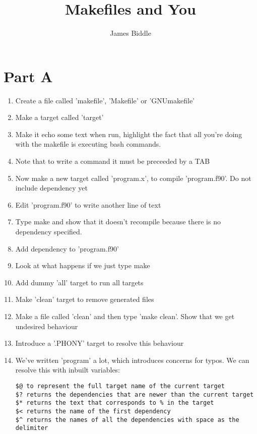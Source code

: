 \documentclass{article}
\begin{document}
\title{Makefiles and You}
\author{James Biddle}
\maketitle
\section{Part A}
\begin{enumerate}
\item Create a file called 'makefile', 'Makefile' or 'GNUmakefile'
\item Make a target called 'target'
\item Make it echo some text when run, highlight the fact that all you're doing with the makefile is executing bash commands.
\item Note that to write a command it must be preceeded by a TAB
\item Now make a new target called 'program.x', to compile 'program.f90'. Do not include dependency yet
\item Edit 'program.f90' to write another line of text
\item Type make and show that it doesn't recompile because there is no dependency specified.
\item Add dependency to 'program.f90'
\item Look at what happens if we just type make
\item Add dummy 'all' target to run all targets
\item Make 'clean' target to remove generated files
\item Make a file called 'clean' and then type 'make clean'. Show that we get undesired behaviour
\item Introduce a '.PHONY' target to resolve this behaviour
\item We've written 'program' a lot, which introduces concerns for typos. We can resolve this with inbuilt variables:
\pagebreak
\begin{lstlisting}
$@ to represent the full target name of the current target
$? returns the dependencies that are newer than the current target
$* returns the text that corresponds to % in the target
$< returns the name of the first dependency
$^ returns the names of all the dependencies with space as the delimiter
\end{lstlisting}
 
\end{enumerate}
\end{document}

